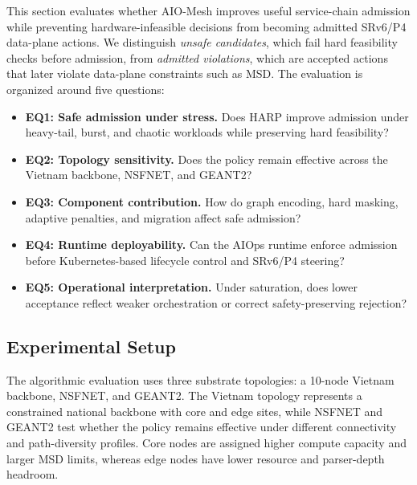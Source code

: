 \documentclass[final,5p]{elsarticle}
\begin{document}
This section evaluates whether AIO-Mesh improves useful service-chain admission while preventing hardware-infeasible decisions from becoming admitted SRv6/P4 data-plane actions. We distinguish \textit{unsafe candidates}, which fail hard feasibility checks before admission, from \textit{admitted violations}, which are accepted actions that later violate data-plane constraints such as MSD. The evaluation is organized around five questions:
\begin{itemize}
    \item \textbf{EQ1: Safe admission under stress.} Does HARP improve admission under heavy-tail, burst, and chaotic workloads while preserving hard feasibility?
    \item \textbf{EQ2: Topology sensitivity.} Does the policy remain effective across the Vietnam backbone, NSFNET, and GEANT2?
    \item \textbf{EQ3: Component contribution.} How do graph encoding, hard masking, adaptive penalties, and migration affect safe admission?
    \item \textbf{EQ4: Runtime deployability.} Can the AIOps runtime enforce admission before Kubernetes-based lifecycle control and SRv6/P4 steering?
    \item \textbf{EQ5: Operational interpretation.} Under saturation, does lower acceptance reflect weaker orchestration or correct safety-preserving rejection?
\end{itemize}

\subsection{Experimental Setup}
\label{subsec:experimental_setup}

The algorithmic evaluation uses three substrate topologies: a 10-node Vietnam backbone, NSFNET, and GEANT2. The Vietnam topology represents a constrained national backbone with core and edge sites, while NSFNET and GEANT2 test whether the policy remains effective under different connectivity and path-diversity profiles. Core nodes are assigned higher compute capacity and larger MSD limits, whereas edge nodes have lower resource and parser-depth headroom.
\end{document}
